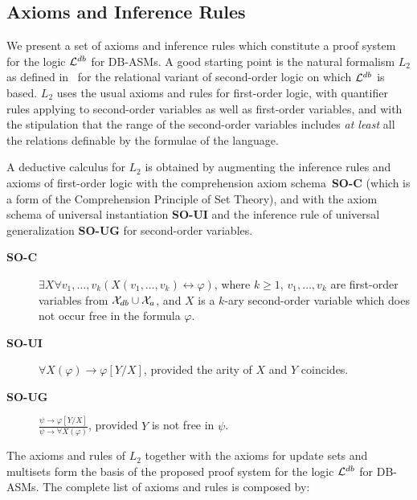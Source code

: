 \documentclass[preprint,11pt]{elsarticle}
\theoremstyle{definition}
\theoremstyle{remark}
\begin{document}
\subsection{Axioms and Inference Rules}\label{sub:AxiomsRules}

We present a set of axioms and inference rules which constitute a proof system for the logic ${\cal L}^{db}$ for DB-ASMs. A good starting point is the natural formalism $L_2$ as defined in~\cite{Leivant94} for the relational variant of second-order logic on which ${\cal L}^{db}$ is based. $L_2$ uses the usual axioms and rules for first-order logic, with quantifier rules applying to second-order variables as well as first-order variables, and with the stipulation that the range of the second-order variables includes \emph{at least} all the relations definable by the formulae of the language. 

A deductive calculus for $L_2$ is obtained by augmenting the inference rules and axioms of first-order logic with the comprehension axiom schema~\textbf{SO-C} (which is a form of the Comprehension Principle of Set Theory), and with the axiom schema of universal instantiation \textbf{SO-UI} and the inference rule of universal generalization \textbf{SO-UG} for second-order variables. 

\begin{description}

  \item[\textbf{SO-C}] $\exists X \forall v_1, \ldots, v_k ( X(v_1, \ldots, v_k) \leftrightarrow \varphi)$, where $k \geq 1$, $v_1, \ldots, v_k$ are first-order variables from ${\cal X}_{db} \cup {\cal X}_a$, and $X$ is a $k$-ary second-order variable which does not occur free in the formula $\varphi$. \smallskip

  \item[\textbf{SO-UI}] $\forall X(\varphi) \rightarrow \varphi[Y/X]$, provided the arity of $X$ and $Y$ coincides. \smallskip

  \item[\textbf{SO-UG}] $\frac{\psi \rightarrow \varphi[Y/X]}{\psi \rightarrow \forall X (\varphi)}$, provided $Y$ is not free in $\psi$. \smallskip

\end{description}


The axioms and rules of $L_2$ together with the axioms for update sets and multisets form the basis of the proposed proof system for the logic ${\cal L}^{db}$ for DB-ASMs. The complete list of axioms and rules is composed by: 
\end{document}
